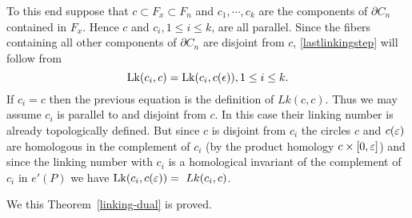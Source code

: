 To this end suppose that $c \subset F_x \subset F_n$ and $c_1,\cdots,c_k$ are the components of $\partial C_n$ contained in $F_x$. Hence
$c$ and $c_i,1 \leq i \leq k$, are all parallel. Since the fibers containing all other components of $\partial C_n$ are disjoint from $c$, \eqref{lastlinkingstep} will follow from
\[
\operatorname{Lk}(c_i,c) = \operatorname{Lk}(c_i, c(\epsilon)), 1 \leq i \leq k.
\]
If $c_i = c$ then the previous equation is the definition of $Lk(c,c)$. Thus we may assume $c_i$ is parallel to and disjoint from $c$. 
In this case their linking number is already topologically defined.
But since $c$ is disjoint from $c_i$ the circles $c$ and $c(\varepsilon)$
are homologous in the complement of $c_i$ (by the product homology
$c \times [0,\varepsilon]$) and since the linking number with $c_i$ is a
homological invariant of the complement of $c_i$ in $e'(P)$ we have
$\operatorname{Lk}(c_i, c(\varepsilon)) =\ Lk(c_i, c)$.

We this Theorem~\ref{linking-dual} is proved. 




